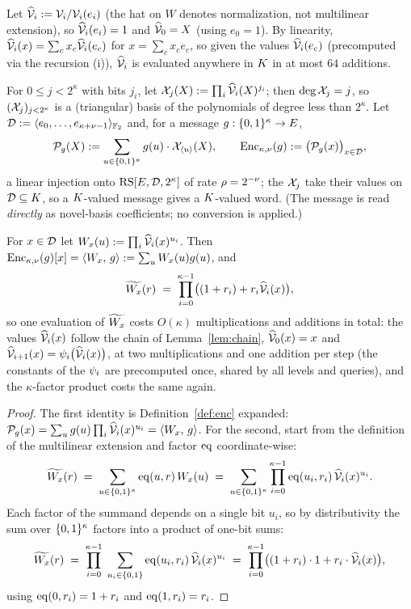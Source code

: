 Let $\widehat{\mathcal{V}}_{i} := \mathcal{V}_i / \mathcal{V}_i(e_i)$ (the hat on $W$ denotes normalization, not multilinear extension), so $\widehat{\mathcal{V}}_{i}(e_i) = 1$ and $\widehat{\mathcal{V}}_{0} = X$ (using $e_0 = 1$). By linearity, $\widehat{\mathcal{V}}_{i}(x) = \sum_c x_c \widehat{\mathcal{V}}_{i}(e_c)$ for $x = \sum_c x_c e_c$, so given the values $\widehat{\mathcal{V}}_{i}(e_c)$ (precomputed via the recursion (i)), $\widehat{\mathcal{V}}_{i}$ is evaluated anywhere in $K$ in at most $64$ additions.

\begin{definition}\label{def:enc}
For $0 \le j < 2^{\kappa}$ with bits $j_i$, let $\mathcal{X}_j(X) := \prod_i \widehat{\mathcal{V}}_{i}(X)^{j_i}$; then $\deg \mathcal{X}_j = j$, so $(\mathcal{X}_j)_{j < 2^\kappa}$ is a (triangular) basis of the polynomials of degree less than $2^{\kappa}$. Let $\mathcal{D} := \langle e_0, \dots, e_{\kappa+\nu-1} \rangle_{\mathbb{F}_2}$ and, for a message $g : \{0,1\}^{\kappa} \to E$,
\[
\mathcal{P}_g(X) := \sum_{u \in \{0,1\}^{\kappa}} g(u) \cdot \mathcal{X}_{\langle u \rangle}(X), \qquad \mathrm{Enc}_{\kappa,\nu}(g) := \bigl(\mathcal{P}_g(x)\bigr)_{x \in \mathcal{D}},
\]
a linear injection onto $\mathrm{RS}[E, \mathcal{D}, 2^{\kappa}]$ of rate $\rho = 2^{-\nu}$; the $\mathcal{X}_j$ take their values on $\mathcal{D} \subseteq K$, so a $K$-valued message gives a $K$-valued word. (The message is read \emph{directly} as novel-basis coefficients; no conversion is applied.)
\end{definition}

\begin{lemma}\label{lem:colweight}
For $x \in \mathcal{D}$ let $W_x(u) := \prod_i \widehat{\mathcal{V}}_{i}(x)^{u_i}$. Then $\mathrm{Enc}_{\kappa,\nu}(g)[x] = \langle W_x,\, g \rangle := \sum_u W_x(u) g(u)$, and
\[
\widetilde{W_x}(r) \;=\; \prod_{i=0}^{\kappa-1} \bigl( (1+r_i) + r_i \widehat{\mathcal{V}}_{i}(x) \bigr),
\]
so one evaluation of $\widetilde{W_x}$ costs $O(\kappa)$ multiplications and additions in total: the values $\widehat{\mathcal{V}}_{i}(x)$ follow the chain of Lemma~\ref{lem:chain}, $\widehat{\mathcal{V}}_{0}(x) = x$ and $\widehat{\mathcal{V}}_{i+1}(x) = \psi_i\bigl(\widehat{\mathcal{V}}_{i}(x)\bigr)$, at two multiplications and one addition per step (the constants of the $\psi_i$ are precomputed once, shared by all levels and queries), and the $\kappa$-factor product costs the same again.
\end{lemma}

\begin{proof}
The first identity is Definition~\ref{def:enc} expanded: $\mathcal{P}_g(x) = \sum_u g(u) \prod_i \widehat{\mathcal{V}}_{i}(x)^{u_i} = \langle W_x,\, g \rangle$. For the second, start from the definition of the multilinear extension and factor $\operatorname{eq}$ coordinate-wise:
\[
\widetilde{W_x}(r) \;=\; \sum_{u \in \{0,1\}^{\kappa}} \operatorname{eq}(u, r)\, W_x(u) \;=\; \sum_{u \in \{0,1\}^{\kappa}} \prod_{i=0}^{\kappa-1} \operatorname{eq}(u_i, r_i)\, \widehat{\mathcal{V}}_{i}(x)^{u_i} .
\]
Each factor of the summand depends on a single bit $u_i$, so by distributivity the sum over $\{0,1\}^{\kappa}$ factors into a product of one-bit sums:
\[
\widetilde{W_x}(r) \;=\; \prod_{i=0}^{\kappa-1} \; \sum_{u_i \in \{0,1\}} \operatorname{eq}(u_i, r_i)\, \widehat{\mathcal{V}}_{i}(x)^{u_i} \;=\; \prod_{i=0}^{\kappa-1} \bigl( (1+r_i) \cdot 1 + r_i \cdot \widehat{\mathcal{V}}_{i}(x) \bigr),
\]
using $\operatorname{eq}(0, r_i) = 1 + r_i$ and $\operatorname{eq}(1, r_i) = r_i$.
\end{proof}

